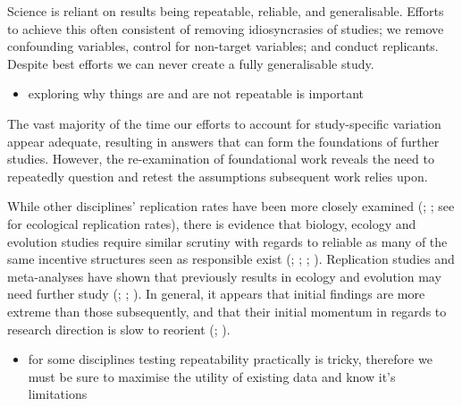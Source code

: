 \documentclass[10pt,a4paper]{article}
\providecommand{\tightlist}{%
  \setlength{\itemsep}{0pt}\setlength{\parskip}{0pt}}
\begin{document}
Science is reliant on results being repeatable, reliable, and generalisable.
Efforts to achieve this often consistent of removing idiosyncrasies of studies; we remove confounding variables, control for non-target variables; and conduct replicants.
Despite best efforts we can never create a fully generalisable study.

\begin{itemize}
\tightlist
\item
  exploring why things are and are not repeatable is important
\end{itemize}

The vast majority of the time our efforts to account for study-specific variation appear adequate, resulting in answers that can form the foundations of further studies.
However, the re-examination of foundational work reveals the need to repeatedly question and retest the assumptions subsequent work relies upon.

While other disciplines' replication rates have been more closely examined (; ; see  for ecological replication rates), there is evidence that biology, ecology and evolution studies require similar scrutiny with regards to reliable as many of the same incentive structures seen as responsible exist (; ; ; ).
Replication studies and meta-analyses have shown that previously results in ecology and evolution may need further study (; ; ).
In general, it appears that initial findings are more extreme than those subsequently, and that their initial momentum in regards to research direction is slow to reorient (; ).

\begin{itemize}
\tightlist
\item
  for some disciplines testing repeatability practically is tricky, therefore we must be sure to maximise the utility of existing data and know it's limitations
\end{itemize}
\end{document}
